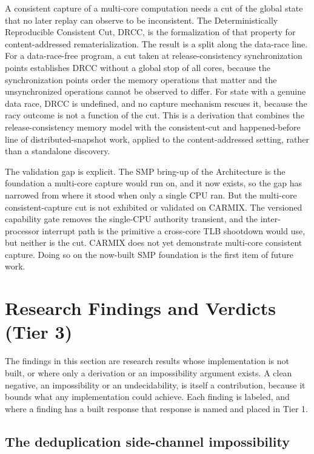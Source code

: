\documentclass[10pt,twocolumn]{article}
\newcommand{\carmix}{CARMIX}
\begin{document}
A consistent capture of a multi-core computation needs a cut of the global state
that no later replay can observe to be inconsistent. The Deterministically
Reproducible Consistent Cut, DRCC, is the formalization of that property for
content-addressed rematerialization. The result is a split along the data-race
line. For a data-race-free program, a cut taken at release-consistency
synchronization points establishes DRCC without a global stop of all cores,
because the synchronization points order the memory operations that matter and the
unsynchronized operations cannot be observed to differ. For state with a genuine
data race, DRCC is undefined, and no capture mechanism rescues it, because the
racy outcome is not a function of the cut. This is a derivation that combines the
release-consistency memory model with the consistent-cut and happened-before line
of distributed-snapshot work, applied to the content-addressed setting, rather
than a standalone discovery.

The validation gap is explicit. The SMP bring-up of the Architecture is the
foundation a multi-core capture would run on, and it now exists, so the gap has
narrowed from where it stood when only a single CPU ran. But the multi-core
consistent-capture cut is not exhibited or validated on \carmix{}. The versioned
capability gate removes the single-CPU authority transient, and the
inter-processor interrupt path is the primitive a cross-core TLB shootdown would
use, but neither is the cut. \carmix{} does not yet demonstrate multi-core
consistent capture. Doing so on the now-built SMP foundation is the first item of
future work.

\section{Research Findings and Verdicts (Tier 3)}

The findings in this section are research results whose implementation is not
built, or where only a derivation or an impossibility argument exists. A clean
negative, an impossibility or an undecidability, is itself a contribution, because
it bounds what any implementation could achieve. Each finding is labeled, and
where a finding has a built response that response is named and placed in Tier 1.

\subsection{The deduplication side-channel impossibility}
\end{document}
